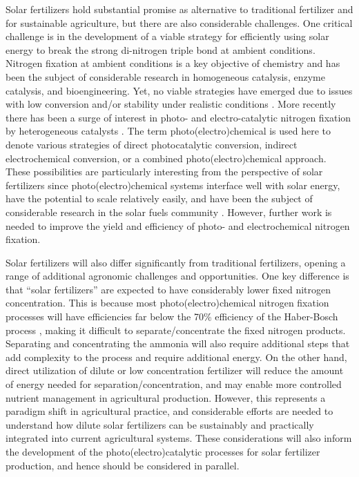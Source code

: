 Solar fertilizers hold substantial promise as alternative to traditional fertilizer and for sustainable agriculture, but there are also considerable challenges. One critical challenge is in the development of a viable strategy for efficiently using solar energy to break the strong di-nitrogen triple bond at ambient conditions. Nitrogen fixation at ambient conditions is a key objective of chemistry and has been the subject of considerable research in homogeneous catalysis, enzyme catalysis, and bioengineering. Yet, no viable strategies have emerged due to issues with low conversion and/or stability under realistic conditions \cite{Vicente_2017,Bur_n_2017,MacLeod_2013,Foster2018}.
More recently there has been a surge of interest in photo- and electro-catalytic nitrogen fixation by heterogeneous catalysts \cite{Medford_2017,Kyriakou_2017,Foster_2018,Chen_2018}. The term photo(electro)chemical is used here to denote various strategies of direct photocatalytic conversion, indirect electrochemical conversion, or a combined photo(electro)chemical approach. These possibilities are particularly interesting from the perspective of solar fertilizers since photo(electro)chemical systems interface well with solar energy, have the potential to scale relatively easily, and have been the subject of considerable research in the solar fuels community \cite{walter_2010, Pinaud_2013,Kondratenko2013,Shaner_2016, Lewis_2016, Montoya_2017}. However, further work is needed to improve the yield and efficiency of photo- and electrochemical nitrogen fixation. %

Solar fertilizers will also differ significantly from traditional fertilizers, opening a range of additional agronomic challenges and opportunities. One key difference is that ``solar fertilizers'' are expected to have considerably lower fixed nitrogen concentration. This is because most photo(electro)chemical nitrogen fixation processes will have efficiencies far below the 70\% efficiency of the Haber-Bosch process \cite{Schloegl_2003, Singh_2017}, making it difficult to separate/concentrate the fixed nitrogen products.
Separating and concentrating the ammonia will also require additional steps that add complexity to the process and require additional energy. On the other hand, direct utilization of dilute or low concentration fertilizer will reduce the amount of energy needed for separation/concentration, and may enable more controlled nutrient management in agricultural production\cite{Bar_Yosef_1999,kafkafi2011fertigation}. However, this represents a paradigm shift in agricultural practice, and considerable efforts are needed to understand how dilute solar fertilizers can be sustainably and practically integrated into current agricultural systems. These considerations will also inform the development of the photo(electro)catalytic processes for solar fertilizer production, and hence should be considered in parallel.

